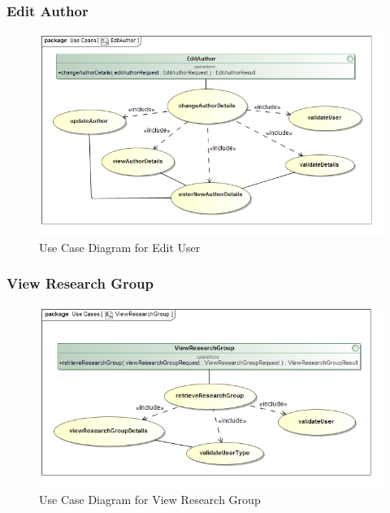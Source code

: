 \documentclass[a4paper,10pt]{article}
\begin{document}
\subsubsection{Edit Author}
	\begin{figure}[h]
		\includegraphics[scale=0.5]{UseEditAuthor}
		\caption{Use Case Diagram for Edit User}
	\end{figure}
	
\subsubsection{View Research Group}
	\begin{figure}[h]
		\includegraphics[scale=0.5]{UseViewResearchGroup}
		\caption{Use Case Diagram for View Research Group}
	\end{figure}
	
\end{document}
